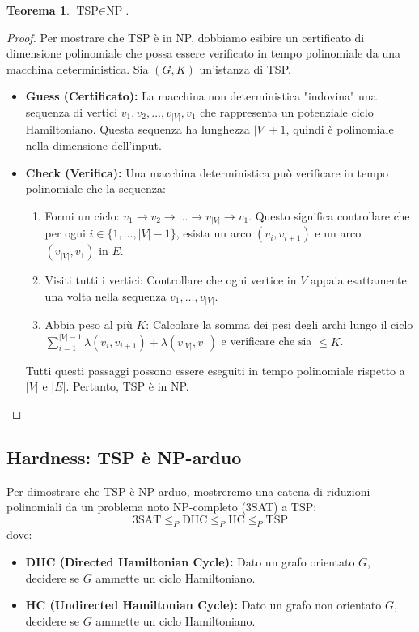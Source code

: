 \documentclass[a4paper, 11pt]{book} %
\newtheorem{theorem}{Teorema}[section]
\theoremstyle{definition}
\begin{document}
\begin{theorem}
$\text{TSP} \in \text{NP}$.
\end{theorem}
\begin{proof}
Per mostrare che TSP è in NP, dobbiamo esibire un certificato di dimensione polinomiale che possa essere verificato in tempo polinomiale da una macchina deterministica.
Sia $(G, K)$ un'istanza di TSP.
\begin{itemize}
    \item \textbf{Guess (Certificato):} La macchina non deterministica "indovina" una sequenza di vertici $v_1, v_2, \dots, v_{|V|}, v_1$ che rappresenta un potenziale ciclo Hamiltoniano. Questa sequenza ha lunghezza $|V|+1$, quindi è polinomiale nella dimensione dell'input.
    \item \textbf{Check (Verifica):} Una macchina deterministica può verificare in tempo polinomiale che la sequenza:
    \begin{enumerate}
        \item Formi un ciclo: $v_1 \to v_2 \to \dots \to v_{|V|} \to v_1$. Questo significa controllare che per ogni $i \in \{1, \dots, |V|-1\}$, esista un arco $(v_i, v_{i+1})$ e un arco $(v_{|V|}, v_1)$ in $E$.
        \item Visiti tutti i vertici: Controllare che ogni vertice in $V$ appaia esattamente una volta nella sequenza $v_1, \dots, v_{|V|}$.
        \item Abbia peso al più $K$: Calcolare la somma dei pesi degli archi lungo il ciclo $\sum_{i=1}^{|V|-1} \lambda(v_i, v_{i+1}) + \lambda(v_{|V|}, v_1)$ e verificare che sia $\le K$.
    \end{enumerate}
Tutti questi passaggi possono essere eseguiti in tempo polinomiale rispetto a $|V|$ e $|E|$.
Pertanto, TSP è in NP.
\end{itemize}
\end{proof}

\subsection{Hardness: TSP è NP-arduo}

Per dimostrare che TSP è NP-arduo, mostreremo una catena di riduzioni polinomiali da un problema noto $\text{NP}$-completo (3SAT) a TSP:
$$ \text{3SAT} \le_P \text{DHC} \le_P \text{HC} \le_P \text{TSP} $$
dove:
\begin{itemize}
    \item \textbf{DHC (Directed Hamiltonian Cycle):} Dato un grafo orientato $G$, decidere se $G$ ammette un ciclo Hamiltoniano.
    \item \textbf{HC (Undirected Hamiltonian Cycle):} Dato un grafo non orientato $G$, decidere se $G$ ammette un ciclo Hamiltoniano.
\end{itemize}
\end{document}
